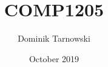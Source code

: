 \documentclass{article}
\theoremstyle{definition}
\begin{document}
  \title{COMP1205}
  \author{Dominik Tarnowski}
  \date{October 2019}
  \maketitle

  \tableofcontents

  
  \subsection{}

  
\end{document}
